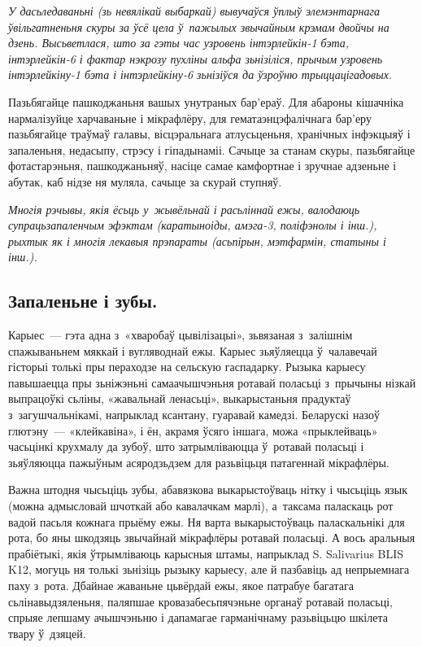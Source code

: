 \emph{У дасьледаваньні (зь невялікай выбаркай) вывучаўся ўплыў элемэнтарнага ўвільгатненьня скуры за ўсё цела ў~пажылых звычайным крэмам двойчы на дзень. Высьветлася, што за гэты час узровень інтэрлейкін-1 бэта, інтэрлейкін-6 і фактар нэкрозу пухліны альфа зьнізіліся, прычым узровень інтэрлейкіну-1 бэта і інтэрлейкіну-6 зьнізіўся да ўзроўню трыццацігадовых.}

Пазьбягайце пашкоджаньня вашых унутраных бар'ераў. Для абароны кішачніка нармалізуйце харчаваньне і мікрафлёру, для гематаэнцэфалічнага бар'еру пазьбягайце траўмаў галавы, вісцэральнага атлусьценьня, хранічных інфэкцыяў і запаленьня, недасыпу, стрэсу і гіпадынаміі. Сачыце за станам скуры, пазьбягайце фотастарэньня, пашкоджаньняў, насіце самае камфортнае і зручнае адзеньне і абутак, каб нідзе ня муляла, сачыце за скурай ступняў.

\emph{Многія рэчывы, якія ёсьць у~жывёльнай і расьліннай ежы, валодаюць супрацьзапаленчым эфэктам (каратыноіды, амэга-3, поліфэнолы і інш.), рыхтык як і многія лекавыя прэпараты (асьпірын, мэтфармін, статыны і інш.).}

\subsection*{Запаленьне і зубы.} 

Карыес~--- гэта адна з~«хваробаў цывілізацыі», зьвязаная з~залішнім спажываньнем мяккай і вугляводнай ежы. Карыес зьяўляецца ў~чалавечай гісторыі толькі пры пераходзе на сельскую гаспадарку. Рызыка карыесу павышаецца пры зьніжэньні самаачышчэньня ротавай поласьці з~прычыны нізкай выпрацоўкі сьліны, «жавальнай ленасьці», выкарыстаньня прадуктаў з~загушчальнікамі, напрыклад ксантану, гуаравай камедзі. Беларускі назоў глютэну~--- «клейкавіна», і ён, акрамя ўсяго іншага, можа «прыклейваць» часьцінкі крухмалу да зубоў, што затрымліваюцца ў~ротавай поласьці і зьяўляюцца пажыўным асяродзьдзем для разьвіцьця патагеннай мікрафлёры. 


Важна штодня чысьціць зубы, абавязкова выкарыстоўваць нітку і чысьціць язык (можна адмысловай шчоткай або кавалачкам марлі), а~таксама паласкаць рот вадой пасьля кожнага прыёму ежы. Ня варта выкарыстоўваць паласкальнікі для рота, бо яны шкодзяць звычайнай мікрафлёры ротавай поласьці. А вось аральныя прабіётыкі, якія ўтрымліваюць карысныя штамы, напрыклад S. Salivarius BLIS K12, могуць ня толькі зьнізіць рызыку карыесу, але й пазбавіць ад непрыемнага паху з~рота. Дбайнае жаваньне цьвёрдай ежы, якое патрабуе багатага сьлінавыдзяленьня, паляпшае кровазабесьпячэньне органаў ротавай поласьці, спрыяе лепшаму ачышчэньню і дапамагае гарманічнаму разьвіцьцю шкілета твару ў~дзяцей.

